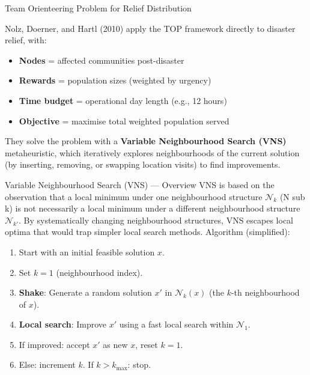 \documentclass[aspectratio=169,10pt]{beamer}
\begin{document}
\begin{frame}[allowframebreaks]{Team Orienteering Problem for Relief Distribution}
  \framebreak

  Nolz, Doerner, and Hartl (2010) apply the TOP framework directly
  to disaster relief, with:
  \begin{itemize}
    \item \textbf{Nodes} = affected communities post-disaster
    \item \textbf{Rewards} = population sizes (weighted by urgency)
    \item \textbf{Time budget} = operational day length (e.g., 12 hours)
    \item \textbf{Objective} = maximise total weighted population served
  \end{itemize}
  They solve the problem with a
  \textbf{Variable Neighbourhood Search (VNS)} metaheuristic,
  which iteratively explores neighbourhoods of the current solution
  (by inserting, removing, or swapping location visits) to find
  improvements.

  \medskip
  \begin{block}{Variable Neighbourhood Search (VNS) --- Overview}
    VNS is based on the observation that a local minimum under one
    neighbourhood structure $\mathcal{N}_k$ (N sub k) is not necessarily
    a local minimum under a different neighbourhood structure
    $\mathcal{N}_{k'}$.
    By systematically changing neighbourhood structures, VNS escapes
    local optima that would trap simpler local search methods.
    Algorithm (simplified):
    \begin{enumerate}
      \item Start with an initial feasible solution $x$.
      \item Set $k = 1$ (neighbourhood index).
      \item \textbf{Shake}: Generate a random solution $x'$ in
            $\mathcal{N}_k(x)$ (the $k$-th neighbourhood of $x$).
      \item \textbf{Local search}: Improve $x'$ using a fast local
            search within $\mathcal{N}_1$.
      \item If improved: accept $x'$ as new $x$, reset $k=1$.
      \item Else: increment $k$. If $k > k_{\max}$: stop.
    \end{enumerate}
  \end{block}
\end{frame}
\end{document}
